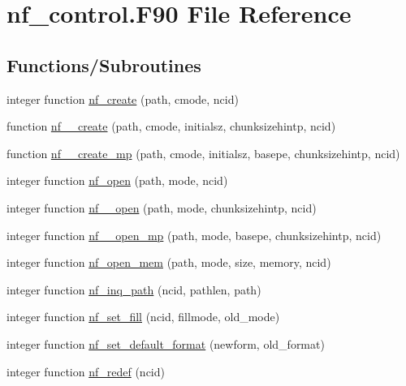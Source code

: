 \hypertarget{nf__control_8F90}{}\section{nf\+\_\+control.\+F90 File Reference}
\label{nf__control_8F90}
\subsection*{Functions/\+Subroutines}
\begin{DoxyCompactItemize}
\item 
integer function \hyperlink{nf__control_8F90_a923c7fd77ba66d8b04141dfc70dc1e6a}{nf\+\_\+create} (path, cmode, ncid)
\item 
function \hyperlink{nf__control_8F90_a91bc14c4db237811056c641a0ee44636}{nf\+\_\+\+\_\+create} (path, cmode, initialsz, chunksizehintp, ncid)
\item 
function \hyperlink{nf__control_8F90_ac38934a3769782465f173347b8c49f25}{nf\+\_\+\+\_\+create\+\_\+mp} (path, cmode, initialsz, basepe, chunksizehintp, ncid)
\item 
integer function \hyperlink{nf__control_8F90_a0f8151804ce6cb953b4686b035fd0b66}{nf\+\_\+open} (path, mode, ncid)
\item 
integer function \hyperlink{nf__control_8F90_adf0af06bfd3b20b314cf7e4dbe6dae54}{nf\+\_\+\+\_\+open} (path, mode, chunksizehintp, ncid)
\item 
integer function \hyperlink{nf__control_8F90_ae3cabb48fc1ab9d5e41f51def78eaa93}{nf\+\_\+\+\_\+open\+\_\+mp} (path, mode, basepe, chunksizehintp, ncid)
\item 
integer function \hyperlink{nf__control_8F90_a81f7e5c1ad55e0a054ec6606ab2c9ff7}{nf\+\_\+open\+\_\+mem} (path, mode, size, memory, ncid)
\item 
integer function \hyperlink{nf__control_8F90_a19cae08e2196f90ae244bba22863388e}{nf\+\_\+inq\+\_\+path} (ncid, pathlen, path)
\item 
integer function \hyperlink{nf__control_8F90_ae91cc6da7dc6b78f49fb34a03edb6d13}{nf\+\_\+set\+\_\+fill} (ncid, fillmode, old\+\_\+mode)
\item 
integer function \hyperlink{nf__control_8F90_ac308be58ac892f3a59dd81b7191da990}{nf\+\_\+set\+\_\+default\+\_\+format} (newform, old\+\_\+format)
\item 
integer function \hyperlink{nf__control_8F90_a6196fc91b24b5fb1749004aa029c7fd1}{nf\+\_\+redef} (ncid)
\item 

\end{DoxyCompactItemize}
